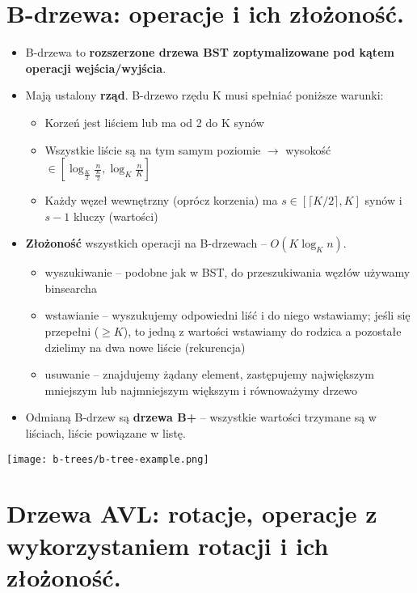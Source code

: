 \documentclass[main.tex]{subfiles}
\begin{document}
    \section{B-drzewa: operacje i ich złożoność.}
    \begin{itemize}
        \item B-drzewa to \textbf{rozszerzone drzewa BST zoptymalizowane pod kątem operacji wejścia/wyjścia}.

        \item Mają ustalony \textbf{rząd}. B-drzewo rzędu K musi spełniać poniższe warunki:
        \begin{itemize}
            \item Korzeń jest liściem lub ma od 2 do K synów
            \item Wszystkie liście są na tym samym poziomie $\rightarrow$ wysokość $\in [\log_{\frac{K}{2}} \frac{n}{\frac{K}{2}}, \log_{K} \frac{n}{K}]$
            \item Każdy węzeł wewnętrzny (oprócz korzenia) ma $s \in [\lceil K/2 \rceil, K]$ synów i $s-1$ kluczy (wartości)
        \end{itemize}

        \item \textbf{Złożoność} wszystkich operacji na B-drzewach -- $O(K \log_{K} n)$.
        \begin{itemize}
            \item wyszukiwanie -- podobne jak w BST, do przeszukiwania węzłów używamy binsearcha
            \item wstawianie -- wyszukujemy odpowiedni liść i do niego wstawiamy; jeśli się przepełni ($\geq K$), to
            jedną z wartości wstawiamy do rodzica a pozostałe dzielimy na dwa nowe liście (rekurencja)
            \item usuwanie -- znajdujemy żądany element, zastępujemy największym mniejszym lub najmniejszym większym
            i równoważymy drzewo
        \end{itemize}

        \item Odmianą B-drzew są \textbf{drzewa B+} -- wszystkie wartości trzymane są w liściach, liście powiązane w listę.

    \end{itemize}

    \texttt{[image: b-trees/b-tree-example.png]}


    \section{Drzewa AVL: rotacje, operacje z wykorzystaniem rotacji i ich złożoność.}
\end{document}
